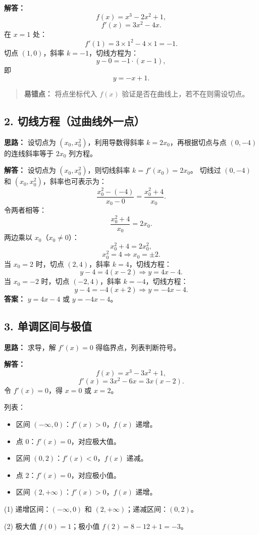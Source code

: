 \documentclass[10pt]{article}
\begin{document}
\textbf{解答：}
$$f(x) = x^3 - 2x^2 + 1,$$
$$f'(x) = 3x^2 - 4x.$$
在 $x=1$ 处：
$$f'(1) = 3 \times 1^2 - 4 \times 1 = -1.$$
切点 $(1,0)$，斜率 $k = -1$，切线方程为：
$$y - 0 = -1 \cdot (x - 1),$$
即
$$y = -x + 1.$$
\begin{quote}
    \textbf{易错点：} 将点坐标代入 $f(x)$ 验证是否在曲线上，若不在则需设切点。
\end{quote}

\subsection*{2. 切线方程（过曲线外一点）}
\textbf{思路：} 设切点为 $(x_0, x_0^2)$，利用导数得斜率 $k = 2x_0$，再根据切点与点 $(0,-4)$ 的连线斜率等于 $2x_0$ 列方程。

\textbf{解答：}
设切点为 $(x_0, x_0^2)$，则切线斜率 $k = f'(x_0) = 2x_0$。
切线过 $(0,-4)$ 和 $(x_0, x_0^2)$，斜率也可表示为：
$$\frac{x_0^2 - (-4)}{x_0 - 0} = \frac{x_0^2 + 4}{x_0}.$$
令两者相等：
$$\frac{x_0^2 + 4}{x_0} = 2x_0.$$
两边乘以 $x_0$（$x_0 \neq 0$）：
$$x_0^2 + 4 = 2x_0^2,$$
$$x_0^2 = 4 \Rightarrow x_0 = \pm 2.$$
当 $x_0 = 2$ 时，切点 $(2,4)$，斜率 $k=4$，切线方程：
$$y - 4 = 4(x - 2) \Rightarrow y = 4x - 4.$$
当 $x_0 = -2$ 时，切点 $(-2,4)$，斜率 $k = -4$，切线方程：
$$y - 4 = -4(x + 2) \Rightarrow y = -4x - 4.$$
\textbf{答案：} $y = 4x - 4$ 或 $y = -4x - 4$。

\subsection*{3. 单调区间与极值}
\textbf{思路：} 求导，解 $f'(x) = 0$ 得临界点，列表判断符号。

\textbf{解答：}
$$f(x) = x^3 - 3x^2 + 1,$$
$$f'(x) = 3x^2 - 6x = 3x(x - 2).$$
令 $f'(x) = 0$，得 $x = 0$ 或 $x = 2$。

列表：
\begin{itemize}
    \item 区间 $(-\infty, 0)$：$f'(x)>0$，$f(x)$ 递增。
    \item 点 $0$：$f'(x)=0$，对应极大值。
    \item 区间 $(0, 2)$：$f'(x)<0$，$f(x)$ 递减。
    \item 点 $2$：$f'(x)=0$，对应极小值。
    \item 区间 $(2, +\infty)$：$f'(x)>0$，$f(x)$ 递增。
\end{itemize}
(1) 递增区间：$(-\infty, 0)$ 和 $(2, +\infty)$；递减区间：$(0, 2)$。

(2) 极大值 $f(0) = 1$；极小值 $f(2) = 8 - 12 + 1 = -3$。
\end{document}
